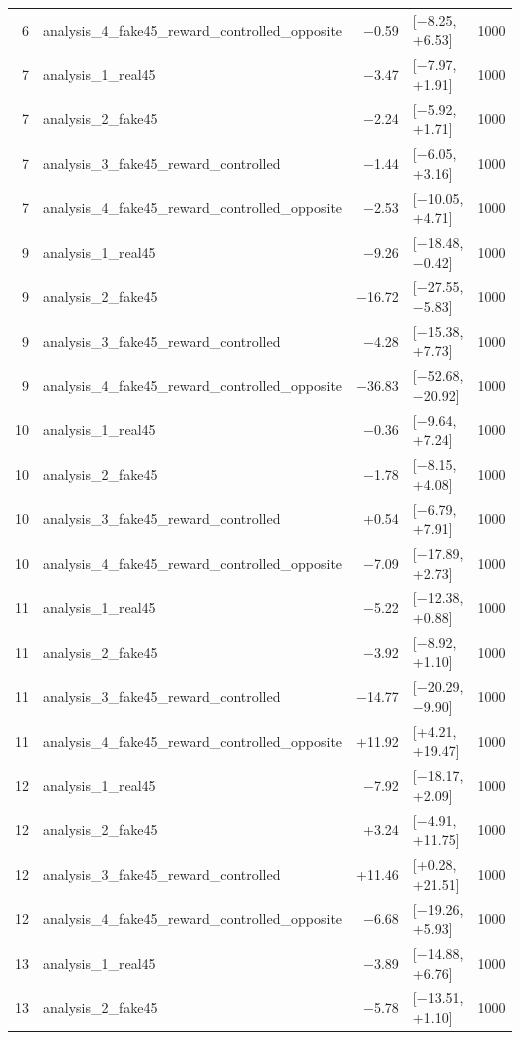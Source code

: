 \begin{table}[htbp]
\begin{tabular}{rlrlr}
    6 & analysis\_4\_fake45\_reward\_controlled\_opposite & −0.59 & [−8.25, +6.53] & 1000 \\
    7 & analysis\_1\_real45 & −3.47 & [−7.97, +1.91] & 1000 \\
    7 & analysis\_2\_fake45 & −2.24 & [−5.92, +1.71] & 1000 \\
    7 & analysis\_3\_fake45\_reward\_controlled & −1.44 & [−6.05, +3.16] & 1000 \\
    7 & analysis\_4\_fake45\_reward\_controlled\_opposite & −2.53 & [−10.05, +4.71] & 1000 \\
    9 & analysis\_1\_real45 & −9.26 & [−18.48, −0.42] & 1000 \\
    9 & analysis\_2\_fake45 & −16.72 & [−27.55, −5.83] & 1000 \\
    9 & analysis\_3\_fake45\_reward\_controlled & −4.28 & [−15.38, +7.73] & 1000 \\
    9 & analysis\_4\_fake45\_reward\_controlled\_opposite & −36.83 & [−52.68, −20.92] & 1000 \\
    10 & analysis\_1\_real45 & −0.36 & [−9.64, +7.24] & 1000 \\
    10 & analysis\_2\_fake45 & −1.78 & [−8.15, +4.08] & 1000 \\
    10 & analysis\_3\_fake45\_reward\_controlled & +0.54 & [−6.79, +7.91] & 1000 \\
    10 & analysis\_4\_fake45\_reward\_controlled\_opposite & −7.09 & [−17.89, +2.73] & 1000 \\
    11 & analysis\_1\_real45 & −5.22 & [−12.38, +0.88] & 1000 \\
    11 & analysis\_2\_fake45 & −3.92 & [−8.92, +1.10] & 1000 \\
    11 & analysis\_3\_fake45\_reward\_controlled & −14.77 & [−20.29, −9.90] & 1000 \\
    11 & analysis\_4\_fake45\_reward\_controlled\_opposite & +11.92 & [+4.21, +19.47] & 1000 \\
    12 & analysis\_1\_real45 & −7.92 & [−18.17, +2.09] & 1000 \\
    12 & analysis\_2\_fake45 & +3.24 & [−4.91, +11.75] & 1000 \\
    12 & analysis\_3\_fake45\_reward\_controlled & +11.46 & [+0.28, +21.51] & 1000 \\
    12 & analysis\_4\_fake45\_reward\_controlled\_opposite & −6.68 & [−19.26, +5.93] & 1000 \\
    13 & analysis\_1\_real45 & −3.89 & [−14.88, +6.76] & 1000 \\
    13 & analysis\_2\_fake45 & −5.78 & [−13.51, +1.10] & 1000 \\

\end{tabular}
\end{table}
